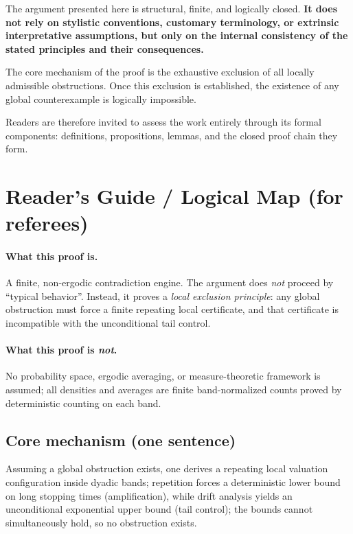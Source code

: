 \documentclass[preprint,12pt]{elsarticle}
\newcommand{\NoProbRef}{No probability space, ergodic averaging, or measure-theoretic framework is assumed; all densities and averages are finite band-normalized counts proved by deterministic counting on each band.}
\begin{document}
The argument presented here is structural, finite, and logically closed.
\textbf{It does not rely on stylistic conventions, customary terminology, or
extrinsic interpretative assumptions, but only on the internal consistency
of the stated principles and their consequences.}

The core mechanism of the proof is the exhaustive exclusion of all locally
admissible obstructions. Once this exclusion is established, the existence
of any global counterexample is logically impossible.

Readers are therefore invited to assess the work entirely through its
formal components: definitions, propositions, lemmas, and the closed proof
chain they form.


\section*{Reader's Guide / Logical Map (for referees)}

\paragraph{What this proof is.}
A finite, non-ergodic contradiction engine.
The argument does \emph{not} proceed by “typical behavior”.
Instead, it proves a \emph{local exclusion principle}:
any global obstruction must force a finite repeating local certificate, and that certificate is incompatible with the unconditional tail control.

\paragraph{What this proof is \emph{not}.}
\noindent\NoProbRef\par

\subsection*{Core mechanism (one sentence)}
Assuming a global obstruction exists, one derives a repeating local valuation configuration inside dyadic bands;
repetition forces a deterministic lower bound on long stopping times (amplification),
while drift analysis yields an unconditional exponential upper bound (tail control);
the bounds cannot simultaneously hold, so no obstruction exists.
\end{document}
